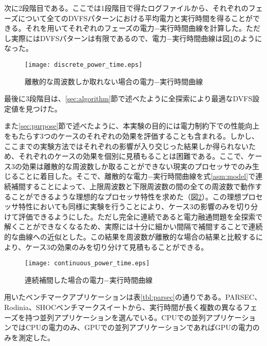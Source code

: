 次に2段階目である。ここでは1段階目で得たログファイルから、それぞれのフェーズについて全てのDVFSパターンにおける平均電力と実行時間を得ることができる。それを用いてそれぞれのフェーズの電力−実行時間曲線を計算した。ただし実際にはDVFSパターンは有限であるので、電力−実行時間曲線は図\ref{fig:discrete_power_time}のようになった。

\begin{figure}[t]
 \begin{center}
  \texttt{[image: discrete\_power\_time.eps]}
 \end{center}
 \caption{離散的な周波数しか取れない場合の電力−実行時間曲線}
 \label{fig:discrete_power_time}
\end{figure}

最後に3段階目は、\ref{sec:algorithm}節で述べたように全探索により最適なDVFS設定値を見つけた。

また\ref{sec:purpose}節で述べたように、本実験の目的には電力制約下での性能向上をもたらす3つのケースのそれぞれの効果を評価することも含まれる。しかし、ここまでの実験方法ではそれぞれの影響が入り交じった結果しか得られないため、それぞれのケースの効果を個別に見積もることは困難である。ここで、ケース3の効果は離散的な周波数しか取ることができない現実のプロセッサでのみ生じることに着目した。そこで、離散的な電力−実行時間曲線を式\ref{asm:model}で連続補間することによって、上限周波数と下限周波数の間の全ての周波数で動作することができるような理想的なプロセッサ特性を求めた（図\ref{fig:continuous_power_time}）。この理想プロセッサ特性においても同様に実験を行うことにより、ケース3の影響のみを切り分けて評価できるようにした。ただし完全に連続であると電力融通問題を全探索で解くことができなくなるため、実際には十分に細かい間隔で補間することで連続的な曲線への近似とした。この結果を周波数が離散的な場合の結果と比較するにより、ケース3の効果のみを切り分けて見積もることができる。

\begin{figure}[t]
 \begin{center}
  \texttt{[image: continuous\_power\_time.eps]}
 \end{center}
 \caption{連続補間した場合の電力−実行時間曲線}
 \label{fig:continuous_power_time}
\end{figure}

用いたベンチマークアプリケーションは表\ref{tbl:parsec}の通りである。PARSEC\cite{Bienia:2008:PBS:1454115.1454128}、Rodinia\cite{Che:2009:RBS:1678998.1680782}、SHOC\cite{Danalis:2010:SHC:1735688.1735702}ベンチマークスイートから、実行時間が長く複数の異なるフェーズを持つ並列アプリケーションを選んでいる。CPUでの並列アプリケーションではCPUの電力のみ、GPUでの並列アプリケーションであればGPUの電力のみを測定した。

